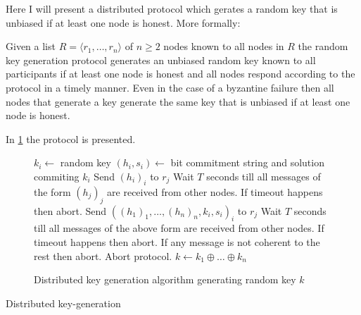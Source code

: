 Here  I will present a distributed protocol which gerates a random key that is
unbiased if at least one node is honest. More formally:

\begin{theorem}
  Given a list $R = \langle r_1, \ldots, r_n \rangle$ of $n \geq 2$ nodes known
  to all nodes in $R$ the random key generation protocol generates an unbiased
  random key known to all participants if at least one node is honest and all
  nodes respond according to the protocol in a timely manner. Even in the case
  of a byzantine failure then all nodes that generate a key generate the same
  key that is unbiased if at least one node is honest.
\end{theorem}

In \ref{fig:key_gen_alg} the protocol is presented.

\begin{figure}
  \label{fig:key_gen_alg}
  \begin{algorithmic}[1]
  \STATE $k_i \leftarrow $ random key
  \STATE $(h_i, s_i) \leftarrow $ bit commitment string and solution commiting
  $k_i$
    \STATE Send $(h_i)_{i}$ to $r_j$
  \ENDFOR
  \STATE Wait $T$ seconds till all messages of the form $(h_j)_j$ are received
  from other nodes. If timeout happens then abort.
    \STATE Send $\left( (h_1)_1, \ldots, (h_n)_{n}, k_i, s_i\right)_i$ to $r_j$
  \ENDFOR
  \STATE Wait $T$ seconds till all messages of the above form are received
  from other nodes. If timeout happens then abort. If any message is not
  coherent to the rest then abort.
      \STATE Abort protocol.
    \ENDIF
  \ENDFOR
  \STATE $k \leftarrow k_1 \oplus \ldots \oplus k_n$
\end{algorithmic}
  \caption{Distributed key generation algorithm generating random key $k$}
\end{figure}


\begin{msc}{Distributed key-generation}
\setlength{\instdist}{5.5cm}
\setlength{\envinstdist}{3cm}
\nextlevel[5]
\nextlevel[2]
\nextlevel[2]
\nextlevel[2]
\nextlevel[2]
\nextlevel[2]
\end{msc}

